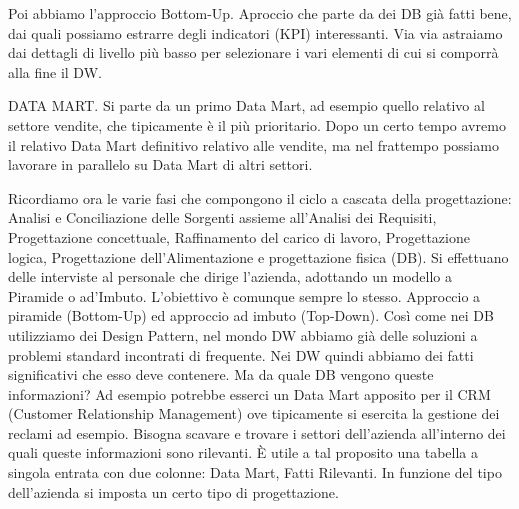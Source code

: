 Poi abbiamo l'approccio Bottom-Up. Aproccio che parte da dei DB già fatti bene, dai quali possiamo estrarre degli indicatori (KPI) interessanti. Via via astraiamo dai dettagli di livello più basso per selezionare i vari elementi di cui si comporrà alla fine il DW.  

DATA MART. Si parte da un primo Data Mart, ad esempio quello relativo al settore vendite, che tipicamente è il più prioritario. Dopo un certo tempo avremo il relativo Data Mart definitivo relativo alle vendite, ma nel frattempo possiamo lavorare in parallelo su Data Mart di altri settori.  

Ricordiamo ora le varie fasi che compongono il ciclo a cascata della progettazione: Analisi e Conciliazione delle Sorgenti assieme all'Analisi dei Requisiti, Progettazione concettuale, Raffinamento del carico di lavoro, Progettazione logica, Progettazione dell'Alimentazione e progettazione fisica (DB). Si effettuano delle interviste al personale che dirige l'azienda, adottando un modello a Piramide o ad'Imbuto. L'obiettivo è comunque sempre lo stesso. Approccio a piramide (Bottom-Up) ed approccio ad imbuto (Top-Down). Così come nei DB utilizziamo dei Design Pattern, nel mondo DW abbiamo già delle soluzioni a problemi standard incontrati di frequente. Nei DW quindi abbiamo dei fatti significativi che esso deve contenere. Ma da quale DB vengono queste informazioni? Ad esempio potrebbe esserci un Data Mart apposito per il CRM (Customer Relationship Management) ove tipicamente si esercita la gestione dei reclami ad esempio. Bisogna scavare e trovare i settori dell'azienda all'interno dei quali queste informazioni sono rilevanti. \`E utile a tal proposito una tabella a singola entrata con due colonne: {Data Mart, Fatti Rilevanti}. In funzione del tipo dell'azienda si imposta un certo tipo di progettazione.  

